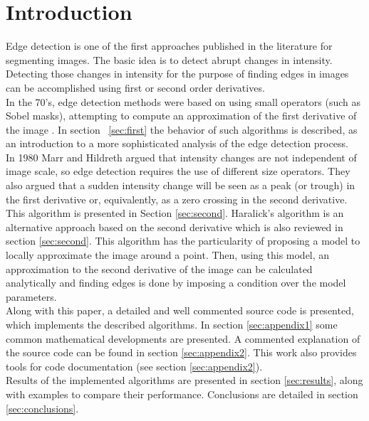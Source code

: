 \documentclass{ipol}
\numberwithin{equation}{section}
\numberwithin{table}{section}
\numberwithin{figure}{section}
\begin{document}
\section{Introduction}
\label{sec:intro}

Edge detection is one of the first approaches published in the literature for 
segmenting images. The basic idea is to detect abrupt changes in intensity. 
Detecting those changes in intensity for the purpose of finding edges in images 
can be accomplished using first or second order derivatives. \\

In the 70's, edge detection methods were based on using small operators 
(such as Sobel masks), attempting to compute an approximation of the
first derivative of the image \cite{Gonzalez2007Digital}. In section ~\ref{sec:first} the 
behavior of such algorithms is described, as an introduction to a more sophisticated 
analysis of the edge detection process.\\

In 1980 Marr and Hildreth \cite{AIM-518} argued that intensity changes are not independent 
of image scale, so edge detection requires the use of different size 
operators. They also argued that a sudden intensity change will be seen 
as a peak (or trough) in the first derivative or, equivalently, as a zero 
crossing in the second derivative. This algorithm is presented in Section \ref{sec:second}. 
Haralick's algorithm \cite{bb20239} is an alternative approach based on the second derivative 
which is also reviewed in section \ref{sec:second}. This algorithm has the particularity of 
proposing a model to locally approximate the image around a point. Then, using this model, 
an approximation to the second derivative of the image can be calculated analytically and 
finding edges is done by imposing a condition over the model parameters. \\

Along with this paper, a detailed and well commented source code is presented, which 
implements the described algorithms. In section \ref{sec:appendix1} some common mathematical developments are presented. 
A commented explanation of the source code can be found in section \ref{sec:appendix2}. This work also provides tools for code documentation 
(see section \ref{sec:appendix2}). \\

Results of the implemented algorithms are presented in section \ref{sec:results}, along with examples 
to compare their performance. Conclusions are detailed in section \ref{sec:conclusions}.
\end{document}
